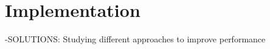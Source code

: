 \chapter{Implementation}
\label{chapter:implementation}

-SOLUTIONS: Studying different approaches to improve performance
